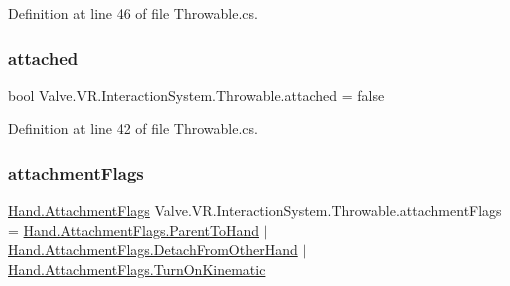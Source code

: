 Definition at line 46 of file Throwable.\+cs.

\mbox{\label{class_valve_1_1_v_r_1_1_interaction_system_1_1_throwable_ac0133980c2673c707c3eddf40d973670}} 
\subsubsection{\texorpdfstring{attached}{attached}}
{\footnotesize\ttfamily bool Valve.\+V\+R.\+Interaction\+System.\+Throwable.\+attached = false\hspace{0.3cm}{\ttfamily [protected]}}



Definition at line 42 of file Throwable.\+cs.

\mbox{\label{class_valve_1_1_v_r_1_1_interaction_system_1_1_throwable_ae9660f75eeae3bc5c0d0d4883ea0e667}} 
\subsubsection{\texorpdfstring{attachmentFlags}{attachmentFlags}}
{\footnotesize\ttfamily \mbox{\hyperlink{class_valve_1_1_v_r_1_1_interaction_system_1_1_hand_a61701f82b8f3fac8818954ec71804cb5}{Hand.\+Attachment\+Flags}} Valve.\+V\+R.\+Interaction\+System.\+Throwable.\+attachment\+Flags = \mbox{\hyperlink{class_valve_1_1_v_r_1_1_interaction_system_1_1_hand_a61701f82b8f3fac8818954ec71804cb5a751b8279634ea59f595145c90a54d8bc}{Hand.\+Attachment\+Flags.\+Parent\+To\+Hand}} $\vert$ \mbox{\hyperlink{class_valve_1_1_v_r_1_1_interaction_system_1_1_hand_a61701f82b8f3fac8818954ec71804cb5a8a58e6540a6a37ae53f78af6e282acb2}{Hand.\+Attachment\+Flags.\+Detach\+From\+Other\+Hand}} $\vert$ \mbox{\hyperlink{class_valve_1_1_v_r_1_1_interaction_system_1_1_hand_a61701f82b8f3fac8818954ec71804cb5a8b6d63187f9074786daaf44d2e4b657d}{Hand.\+Attachment\+Flags.\+Turn\+On\+Kinematic}}}



